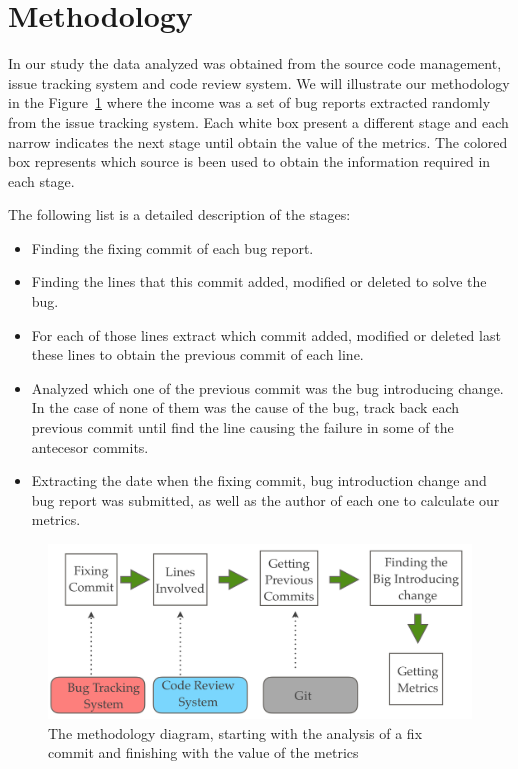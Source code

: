 \documentclass[10pt, conference]{IEEEtran}
\begin{document}
\section{Methodology}
\label{sec:methodology}
In our study the data analyzed was obtained from the source code management, issue tracking system and code review system. We will illustrate our methodology in the Figure~\ref{fig:methodology} where the income was a set of bug reports extracted randomly from the issue tracking system. Each white box present a different stage and each narrow indicates the next stage until obtain the value of the metrics. The colored box represents which source is been used to obtain the information required in each stage.

The following list is a detailed description of the stages: 
\begin{itemize}
		\item Finding the fixing commit of each bug report.
		\item Finding the lines that this commit added, modified or deleted to solve the bug.
		\item For each of those lines extract which commit added, modified or deleted last these lines to obtain the previous commit of each line.
		\item Analyzed which one of the previous commit was the bug introducing change. In the case of none of them was the cause of the bug, track back each previous commit until find the line causing the failure in some of the antecesor commits.
		\item Extracting the date when the fixing commit, bug introduction change and bug report was submitted, as well as the author of each one to calculate our metrics.	
\end{itemize} 

\begin{figure}[ht]
\centering
\includegraphics[width=\columnwidth]{methodology.png}
\caption{The methodology diagram, starting with the analysis of a fix commit and finishing with the value of the metrics}
\label{fig:methodology}       %
\end{figure}
\end{document}

